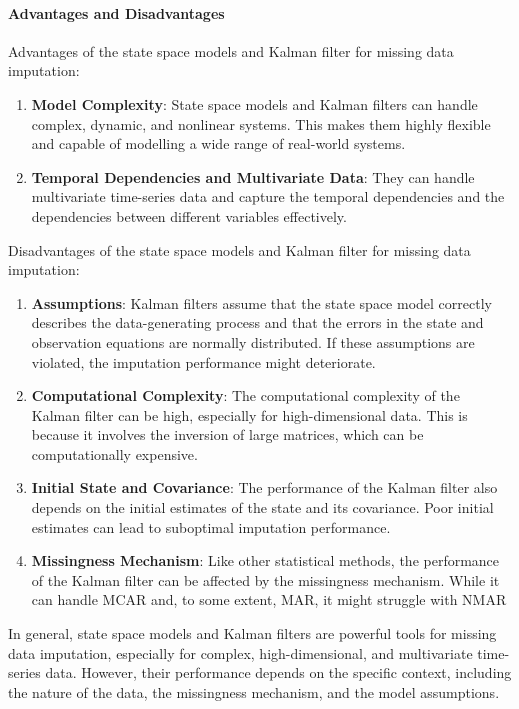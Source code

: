 \documentclass[a4paper,12pt,twoside,openright]{report}
\begin{document}
\paragraph{Advantages and Disadvantages} Advantages of the state space models and Kalman filter for missing data imputation:

\begin{enumerate}
    \item \textbf{Model Complexity}: State space models and Kalman filters can handle complex, dynamic, and nonlinear systems. This makes them highly flexible and capable of modelling a wide range of real-world systems.
    \item \textbf{Temporal Dependencies and Multivariate Data}: They can handle multivariate time-series data and capture the temporal dependencies and the dependencies between different variables effectively.
\end{enumerate}

Disadvantages of the state space models and Kalman filter for missing data imputation:

\begin{enumerate}
    \item \textbf{Assumptions}: Kalman filters assume that the state space model correctly describes the data-generating process and that the errors in the state and observation equations are normally distributed. If these assumptions are violated, the imputation performance might deteriorate.
    \item \textbf{Computational Complexity}: The computational complexity of the Kalman filter can be high, especially for high-dimensional data. This is because it involves the inversion of large matrices, which can be computationally expensive.
    \item \textbf{Initial State and Covariance}: The performance of the Kalman filter also depends on the initial estimates of the state and its covariance. Poor initial estimates can lead to suboptimal imputation performance.
    \item \textbf{Missingness Mechanism}: Like other statistical methods, the performance of the Kalman filter can be affected by the missingness mechanism. While it can handle MCAR and, to some extent, MAR, it might struggle with NMAR
\end{enumerate}

In general, state space models and Kalman filters are powerful tools for missing data imputation, especially for complex, high-dimensional, and multivariate time-series data. However, their performance depends on the specific context, including the nature of the data, the missingness mechanism, and the model assumptions.
\end{document}
